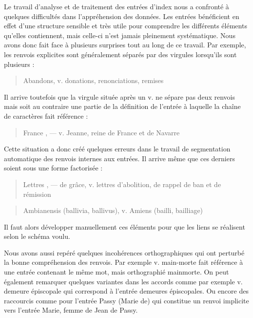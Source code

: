 \documentclass[a4paper,12pt,twoside]{book}
\begin{document}
	Le travail d'analyse et de traitement des entrées d'index nous a confronté à quelques difficultés dans l'appréhension des données. Les entrées bénéficient en effet d'une structure sensible et très utile pour comprendre les différents éléments qu'elles contiennent, mais celle-ci n'est jamais pleinement systématique. Nous avons donc fait face à plusieurs surprises tout au long de ce travail. Par exemple, les renvois explicites sont généralement séparés par des virgules lorsqu'ils sont plusieurs :
	
	\begin{quotation}
		Abandons, v. donations, renonciations, remises
	\end{quotation}

	\noindent Il arrive toutefois que la virgule située après un \og v.\fg{} ne sépare pas deux renvois mais soit au contraire une partie de la définition de l'entrée à laquelle la chaîne de caractères fait référence :
	
	\begin{quotation}
		France , — v. Jeanne, reine de France et de Navarre
	\end{quotation}

	\noindent Cette situation a donc créé quelques erreurs dans le travail de segmentation automatique des renvois internes aux entrées. Il arrive même que ces derniers soient sous une forme factorisée :
	
	\begin{quotation}
		Lettres , — de grâce, v. lettres d'abolition, de rappel de
			ban et de rémission
	\end{quotation}

	\begin{quotation}
		Ambianensis (ballivia, ballivus), v. Amiens (bailli, bailliage)
	\end{quotation}

	\noindent Il faut alors développer manuellement ces éléments pour que les liens se réalisent selon le schéma voulu.
	
	Nous avons aussi repéré quelques incohérences orthographiques qui ont perturbé la bonne compréhension des renvois. Par exemple \og v. main-morte\fg{} fait référence à une entrée contenant le même mot, mais orthographié \og mainmorte\fg{}. On peut également remarquer quelques variantes dans les accords comme par exemple \og v. demeure épiscopale\fg{} qui correspond à l'entrée \og demeures épiscopales\fg{}. Ou encore des raccourcis comme pour l'entrée \og Passy (Marie de)\fg{} qui constitue un renvoi implicite vers l'entrée \og Marie, femme de Jean de Passy\fg{}. 
	
\end{document}
